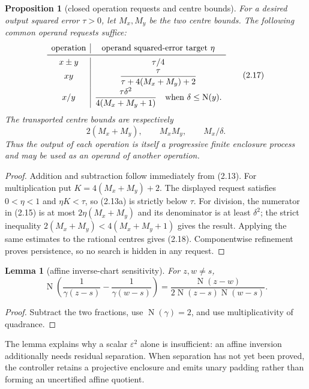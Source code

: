 \documentclass[10pt]{article}
\newtheorem{lemma}[theorem]{Lemma}
\newtheorem{proposition}[theorem]{Proposition}
\theoremstyle{definition}
\theoremstyle{remark}
\newcommand{\Norm}{\operatorname{N}}
\begin{document}
\begin{proposition}[closed operation requests and centre bounds]
For a desired output squared error $\tau>0$, let $M_x,M_y$ be the two centre
bounds.  The following common operand requests suffice:
\[
\begin{array}{c|c}
\text{operation}&\text{operand squared-error target }\eta\\ \midrule
x\mathbin{\pm}y&\tau/4\\[2pt]
xy&\displaystyle
 \frac{\tau}{\tau+4(M_x+M_y)+2}\\[7pt]
x/y&\displaystyle
 \frac{\tau\delta^2}{4(M_x+M_y+1)}
 \quad\text{when }\delta\le\Norm(y).
\end{array}
\tag{2.17}
\]
The transported centre bounds are respectively
\[
 2(M_x+M_y),\qquad M_xM_y,\qquad M_x/\delta.
\tag{2.18}
\]
Thus the output of each operation is itself a progressive finite enclosure
process and may be used as an operand of another operation.
\end{proposition}

\begin{proof}
Addition and subtraction follow immediately from (2.13).  For
multiplication put $K=4(M_x+M_y)+2$.  The displayed request satisfies
$0<\eta<1$ and $\eta K<\tau$, so (2.13a) is strictly below $\tau$.
For division, the numerator in (2.15) is at most
$2\eta(M_x+M_y)$ and its denominator is at least $\delta^2$; the strict
inequality $2(M_x+M_y)<4(M_x+M_y+1)$ gives the result.  Applying the same
estimates to the rational centres gives (2.18).  Componentwise refinement
proves persistence, so no search is hidden in any request.
\end{proof}

\begin{lemma}[affine inverse-chart sensitivity]
For $z,w\ne s$,
\[
 \Norm\!\left(
 \frac1{\gamma(z-s)}-\frac1{\gamma(w-s)}\right)
 =\frac{\Norm(z-w)}
 {2\Norm(z-s)\Norm(w-s)}.
\tag{2.19}
\]
\end{lemma}

\begin{proof}
Subtract the two fractions, use $\Norm(\gamma)=2$, and use
multiplicativity of quadrance.
\end{proof}

The lemma explains why a scalar $\varepsilon^2$ alone is insufficient: an
affine inversion additionally needs residual separation.  When separation
has not yet been proved, the controller retains a projective enclosure and
emits unary padding rather than forming an uncertified affine quotient.
\end{document}
